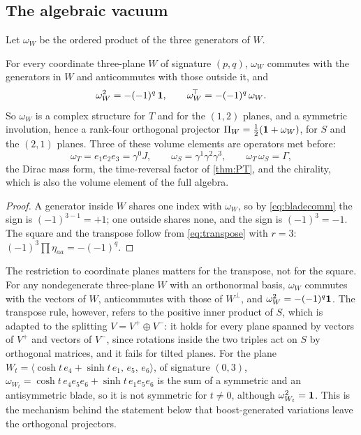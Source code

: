 \subsection{The algebraic vacuum}

Let $\omega_W$ be the ordered product of the three generators of $W$.

\begin{theorem}
\label{thm:subdichotomy}
For every coordinate three-plane $W$ of signature $(p,q)$, $\omega_W$ commutes with the generators in $W$ and anticommutes with those outside it, and
\[
\omega_W^2=-(-1)^q\,\mathbf 1,\qquad \omega_W^{\!\top}=-(-1)^q\,\omega_W .
\]
So $\omega_W$ is a complex structure for $T$ and for the $(1,2)$ planes, and a symmetric involution, hence a rank-four orthogonal projector
$\Pi_W=\tfrac12(\mathbf 1+\omega_W)$, for $S$ and the $(2,1)$ planes. Three of these volume elements are operators met before:
\[
\omega_T=e_1e_2e_3=\gamma^0J,\qquad \omega_S=\gamma^1\gamma^2\gamma^3,\qquad \omega_T\,\omega_S=\Gamma ,
\]
the Dirac mass form, the time-reversal factor of \cref{thm:PT}, and the chirality, which is also the volume element of the full algebra.
\end{theorem}

\begin{proof}
A generator inside $W$ shares one index with $\omega_W$, so by \eqref{eq:bladecomm} the sign is $(-1)^{3-1}=+1$; one outside shares none, and
the sign is $(-1)^3=-1$. The square and the transpose follow from \eqref{eq:transpose} with $r=3$: $(-1)^{3}\prod\eta_{aa}=-(-1)^q$.
\end{proof}

The restriction to coordinate planes matters for the transpose, not for the square. For any nondegenerate three-plane $W$ with an orthonormal basis,
$\omega_W$ commutes with the vectors of $W$, anticommutes with those of $W^\perp$, and $\omega_W^2=-(-1)^q\mathbf 1$. The transpose rule, however, refers to the
positive inner product of $S$, which is adapted to the splitting $V=V^+\oplus V^-$: it holds for every plane spanned by vectors of $V^+$ and vectors of $V^-$,
since rotations inside the two triples act on $S$ by orthogonal matrices, and it fails for tilted planes. For the plane
$W_t=\langle\cosh t\,e_4+\sinh t\,e_1,\,e_5,\,e_6\rangle$, of signature $(0,3)$, $\omega_{W_t}=\cosh t\,e_4e_5e_6+\sinh t\,e_1e_5e_6$ is the sum of a symmetric and an
antisymmetric blade, so it is not symmetric for $t\neq0$, although $\omega_{W_t}^2=\mathbf 1$. This is the mechanism behind the statement below that boost-generated
variations leave the orthogonal projectors.

